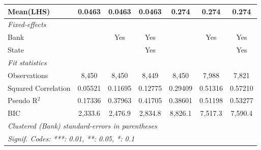 \begin{tabular}{lcccccc}
   Mean(LHS)                          & 0.0463         & 0.0463         & 0.0463         & 0.274          & 0.274          & 0.274\\  
   \midrule
   \emph{Fixed-effects}\\
   Bank                               &                & Yes            & Yes            &                & Yes            & Yes\\  
   State                              &                &                & Yes            &                &                & Yes\\  
   \midrule
   \emph{Fit statistics}\\
   Observations                       & 8,450          & 8,450          & 8,449          & 8,450          & 7,988          & 7,821\\  
   Squared Correlation                & 0.05521        & 0.11695        & 0.12775        & 0.29409        & 0.51316        & 0.57210\\  
   Pseudo R$^2$                       & 0.17336        & 0.37963        & 0.41705        & 0.38601        & 0.51198        & 0.53277\\  
   BIC                                & 2,333.6        & 2,476.9        & 2,834.8        & 8,826.1        & 7,517.3        & 7,590.4\\  
   \midrule \midrule
   \multicolumn{7}{l}{\emph{Clustered (Bank) standard-errors in parentheses}}\\
   \multicolumn{7}{l}{\emph{Signif. Codes: ***: 0.01, **: 0.05, *: 0.1}}\\
\end{tabular}
\par\endgroup

